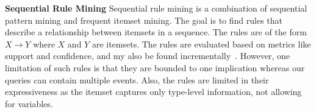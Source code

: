 \textbf{Sequential Rule Mining}
Sequential rule mining \cite{fournier2011rulegrowth,erminer} is a combination of sequential pattern mining and
frequent itemset mining. The goal is to find rules that describe a
relationship between itemsets in a sequence. The rules are of the form
$X \rightarrow Y$ where $X$ and $Y$ are itemsets. The rules are
evaluated based on metrics like support and
confidence, and my also be found
incrementally~\cite{ierminer}.
However, one limitation of such rules is that they are
bounded to
one implication whereas our queries can contain multiple events.
Also, the rules are limited in their expressiveness as
the itemset captures only type-level information, not
allowing for variables.




